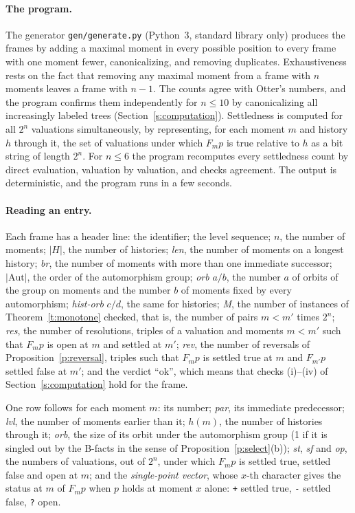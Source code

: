 \documentclass{situationist-preprint}
\begin{document}
\paragraph{The program.} The generator \texttt{gen/generate.py} (Python~3, standard library only) produces the frames by adding a maximal moment in every possible position to every frame with one moment fewer, canonicalizing, and removing duplicates. Exhaustiveness rests on the fact that removing any maximal moment from a frame with $n$ moments leaves a frame with $n-1$. The counts agree with Otter's numbers, and the program confirms them independently for $n \leq 10$ by canonicalizing all \NLabelled{} increasingly labeled trees (Section~\ref{s:computation}). Settledness is computed for all $2^n$ valuations simultaneously, by representing, for each moment $m$ and history $h$ through it, the set of valuations under which $F_m p$ is true relative to $h$ as a bit string of length $2^n$. For $n \leq 6$ the program recomputes every settledness count by direct evaluation, valuation by valuation, and checks agreement. The output is deterministic, and the program runs in a few seconds.

\paragraph{Reading an entry.} Each frame has a header line:
the identifier; the level sequence; $n$, the number of moments; $|H|$, the number of histories; \emph{len}, the number of moments on a longest history; \emph{br}, the number of moments with more than one immediate successor; $|\mathrm{Aut}|$, the order of the automorphism group; \emph{orb} $a/b$, the number $a$ of orbits of the group on moments and the number $b$ of moments fixed by every automorphism; \emph{hist-orb} $c/d$, the same for histories; \emph{M}, the number of instances of Theorem~\ref{t:monotone} checked, that is, the number of pairs $m < m'$ times $2^n$; \emph{res}, the number of resolutions, triples of a valuation and moments $m < m'$ such that $F_m p$ is open at $m$ and settled at $m'$; \emph{rev}, the number of reversals of Proposition~\ref{p:reversal}, triples such that $F_m p$ is settled true at $m$ and $F_{m'} p$ settled false at $m'$; and the verdict \enquote{ok}, which means that checks (i)--(iv) of Section~\ref{s:computation} hold for the frame.

One row follows for each moment $m$: its number; \emph{par}, its immediate predecessor; \emph{lvl}, the number of moments earlier than it; $h(m)$, the number of histories through it; \emph{orb}, the size of its orbit under the automorphism group (1 if it is singled out by the B-facts in the sense of Proposition~\ref{p:select}(b)); \emph{st}, \emph{sf} and \emph{op}, the numbers of valuations, out of $2^n$, under which $F_m p$ is settled true, settled false and open at $m$; and the \emph{single-point vector}, whose $x$-th character gives the status at $m$ of $F_m p$ when $p$ holds at moment $x$ alone: \texttt{+} settled true, \texttt{-} settled false, \texttt{?} open.
\end{document}
